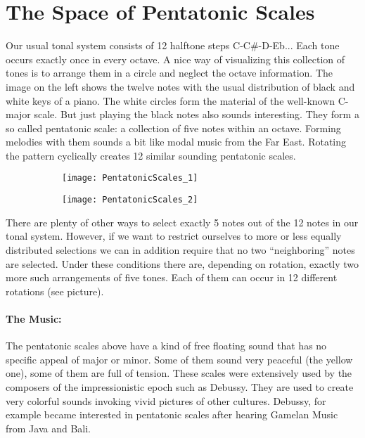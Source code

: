 \section{The Space of Pentatonic Scales}
Our usual tonal system consists of 12 halftone steps C-C\#-D-Eb... Each tone occurs exactly once in every octave. A nice way of visualizing this collection of tones is to arrange them in a circle and neglect the octave information. The image on the left shows the twelve notes with the usual distribution of black and white keys of a piano. The white circles form the material of the well-known C-major scale. But just playing the black notes also sounds interesting. They form a so called pentatonic scale: a collection of five notes within an octave. Forming melodies with them sounds a bit like modal music from the Far East. Rotating the pattern cyclically creates 12 similar sounding pentatonic scales.

\begin{figure}[h]
\centering
\begin{subfigure}{0.45\textwidth}
\centering
\texttt{[image: PentatonicScales\_1]}
\end{subfigure}
\begin{subfigure}{0.45\textwidth}
\centering
\texttt{[image: PentatonicScales\_2]}
\end{subfigure}
\end{figure}

There are plenty of other ways to select exactly 5 notes out of the 12 notes in our tonal system. However, if we want to restrict ourselves to more or less equally distributed selections we can in addition require that no two ``neighboring'' notes are selected. Under these conditions there are, depending on rotation, exactly two more such arrangements of five tones. Each of them can occur in 12 different rotations (see picture). 

\paragraph{The Music:} The pentatonic scales above have a kind of free floating sound that has no specific appeal of major or minor. Some of them sound very peaceful (the yellow one), some of them are full of tension. These scales were extensively used by the composers of the impressionistic epoch such as Debussy. They are used to create very colorful sounds invoking vivid pictures of other cultures. Debussy, for example became interested in pentatonic scales after hearing Gamelan Music from Java and Bali.

